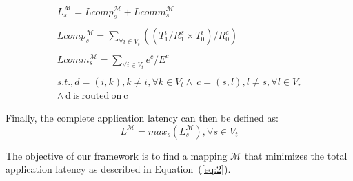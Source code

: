 \documentclass[10pt, conference, compsocconf]{IEEEtran}
\begin{document}
\begin{equation}
  \begin{array}{c}
    L^{\mathcal{M}}_s = Lcomp^{\mathcal{M}}_s +
    Lcomm^{\mathcal{M}}_s\\
	\\Lcomp^{\mathcal{M}}_s = 
    \sum_{\forall i \in V_t} ((T^i_1/R^s_1\times T^i_0)/R^c_0)\\
    \\Lcomm^{\mathcal{M}}_s =
    \sum_{\forall i \in V_t} e^c / E^c\\ 
    \\s.t., d = (i,k), k \neq i, \forall k
    \in V_t \wedge\  c = (s,l), l \neq s, \forall l \in V_r \\
    \wedge\ \mathrm{d\ is\ routed\ on\ c}
  \end{array}
  \label{eq:1}
\end{equation}

Finally, the complete application latency can then be defined as:
\begin{equation}
  \label{eq:2}
  L^{\mathcal{M}} = max_{s}
  ({L^{\mathcal{M}}_s}), \forall s \in V_t
\end{equation}

The objective of our framework is to find a mapping $\mathcal{M}$
that minimizes the total application latency as described in
Equation~(\ref{eq:2}).
\end{document}
